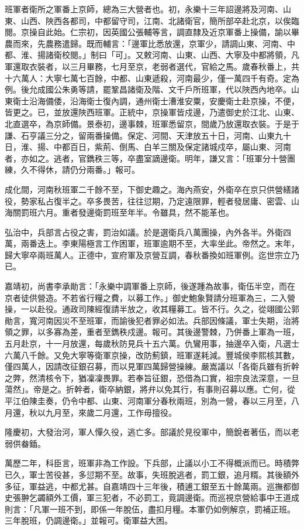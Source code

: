 班軍者衛所之軍番上京師，總為三大營者也。初，永樂十三年詔邊將及河南、山東、山西、陜西各都司，中都留守司，江南、北諸衛官，簡所部卒赴北京，以俟臨閱。京操自此始。仁宗初，因英國公張輔等言，調直隸及近京軍番上操備，諭以畢農而來，先農務遣歸。既而輔言：「邊軍比悉放還，京軍少，請調山東、河南、中都、淮、揚諸衛校閱。」制曰「可」。又敕河南、山東、山西、大寧及中都將領，凡軍還取衣裝者，以三月畢務，七月至京，老弱者選代，官給之馬。歲春秋番上，共十六萬人：大寧七萬七百餘，中都、山東遞殺，河南最少，僅一萬四千有奇。定為例。後允成國公朱勇等請，罷鞏昌諸衛及階、文千戶所班軍，代以陜西內地卒。山東衛士沿海備倭，沿海衛士復內調，通州衛士漕淮安粟，安慶衛士赴京操，不便，皆更之。已，並放還陜西班軍。正統中，京操軍皆戍邊，乃遣御史於江北、山東、北直選卒，為京師備。景泰初，邊事棘，班軍悉留京，間歲乃放還取衣裝。于是于謙、石亨議三分之，留兩番操備。保定、河間、天津放五十日，河南、山東九十日，淮、揚、中都百日，紫荊、倒馬、白羊三關及保定諸城戍卒，屬山東、河南者，亦如之。逃者，官鐫秩三等，卒盡室謫邊衛。明年，謙又言：「班軍分十營團練，久不得休，請仍分兩番。」報可。

成化間，河南秋班軍二千餘不至，下御史趣之。海內燕安，外衛卒在京只供營繕諸役，勢家私占復半之。卒多畏苦，往往愆期，乃定遠限罪，輕者發居庸、密雲、山海關罰班六月。重者發邊衛罰班至年半。令雖具，然不能革也。

弘治中，兵部言占役之害，罰治如議。於是選衛兵八萬團操，內外各半。外衛四萬，兩番迭上。李東陽極言工作困軍，班軍逾期不至，大率坐此。帝然之。末年，歸大寧卒兩班萬人。正德中，宣府軍及京營互調，春秋番換如班軍例。迄世宗立乃已。

嘉靖初，尚書李承勛言：「永樂中調軍番上京師，後遂踵為故事，衛伍半空，而在京者徒供營造。不若省行糧之費，以募工作。」御史鮑象賢請分班軍為三，二入營操，一以赴役。通政司陳經復請半放之，收其糧募工。皆不行。久之，從翊國公郭勛言，寬河南因災不至班軍，而諭後犯者罪必如法。兵部因條議，軍士失期，治將領之罪，以多寡為差，重者至鐫秩戍邊。報可。其後邊警棘，乃併番上軍為一班，五月赴京，十一月放還，每歲秋防見兵十五六萬。仇鸞用事，抽邊卒入衛，凡選士六萬八千餘。又免大寧等衛軍京操，改防薊鎮，班軍遂耗減。豐城侯李熙核其數，僅四萬人，因請改征銀召募，而以見軍四萬歸營操練。嚴嵩議以「各衛兵雖有折幹之弊，然清核令下，猶凜凜畏罪。若奉旨征銀，恐借為口實，祖宗良法深意，一旦蕩然」。帝是之。折幹者，衛卒納銀，將弁以免其行，有事則召募以應。亡何，從平江伯陳圭奏，仍令中都、山東、河南軍分春秋兩班，別為一營，春以三月至，八月還，秋以九月至，來歲二月還，工作毋擅役。

隆慶初，大發治河，軍人憚久役，逃亡多。部議於見役軍中，簡銳者著伍，而以老弱供畚鍤。

萬歷二年，科臣言，班軍非為工作設。下兵部，止議以小工不得概派而已。時積弊已久，軍士苦役甚，多愆期不至。故事，失班脫逃者，罰工銀，追月糈。其後額外多征，軍益逃，中都尤甚。自嘉靖四十三年後，積逋工銀至五十餘萬兩。巡撫都御史張翀乞蠲額外工價，軍三犯者，不必罰工，竟調邊衛。而巡視京營給事中王道成則言：「凡軍一班不到，即係一年脫伍，盡扣月糧。本軍仍如例解京，罰補正班。三年脫班，仍調邊衛。」並報可。衛軍益大困。

